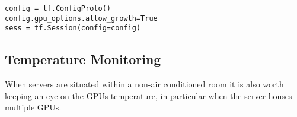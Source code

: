 \documentclass[
]{book}
\begin{document}
\begin{verbatim}
config = tf.ConfigProto()
config.gpu_options.allow_growth=True
sess = tf.Session(config=config)
\end{verbatim}

\hypertarget{temperature-monitoring}{%
\subsection{Temperature Monitoring}\label{temperature-monitoring}}

When servers are situated within a non-air conditioned room it is also worth keeping an eye on the GPUs temperature, in particular when the server houses multiple GPUs.

  
\end{document}
